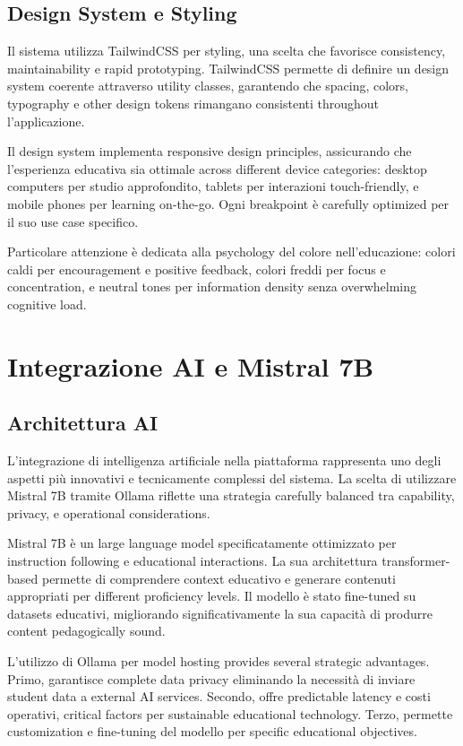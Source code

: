 \documentclass[12pt,a4paper]{article}
\begin{document}
\subsection{Design System e Styling}

Il sistema utilizza TailwindCSS per styling, una scelta che favorisce consistency, maintainability e rapid prototyping. TailwindCSS permette di definire un design system coerente attraverso utility classes, garantendo che spacing, colors, typography e other design tokens rimangano consistenti throughout l'applicazione.

Il design system implementa responsive design principles, assicurando che l'esperienza educativa sia ottimale across different device categories: desktop computers per studio approfondito, tablets per interazioni touch-friendly, e mobile phones per learning on-the-go. Ogni breakpoint è carefully optimized per il suo use case specifico.

Particolare attenzione è dedicata alla psychology del colore nell'educazione: colori caldi per encouragement e positive feedback, colori freddi per focus e concentration, e neutral tones per information density senza overwhelming cognitive load.

\section{Integrazione AI e Mistral 7B}

\subsection{Architettura AI}

L'integrazione di intelligenza artificiale nella piattaforma rappresenta uno degli aspetti più innovativi e tecnicamente complessi del sistema. La scelta di utilizzare Mistral 7B tramite Ollama riflette una strategia carefully balanced tra capability, privacy, e operational considerations.

Mistral 7B è un large language model specificatamente ottimizzato per instruction following e educational interactions. La sua architettura transformer-based permette di comprendere context educativo e generare contenuti appropriati per different proficiency levels. Il modello è stato fine-tuned su datasets educativi, migliorando significativamente la sua capacità di produrre content pedagogically sound.

L'utilizzo di Ollama per model hosting provides several strategic advantages. Primo, garantisce complete data privacy eliminando la necessità di inviare student data a external AI services. Secondo, offre predictable latency e costi operativi, critical factors per sustainable educational technology. Terzo, permette customization e fine-tuning del modello per specific educational objectives.
\end{document}
